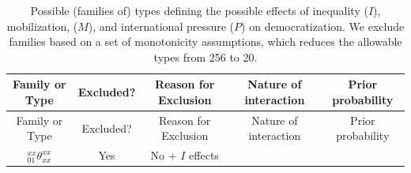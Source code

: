 \documentclass[12pt,]{book}
\begin{document}
\begin{longtable}[]{@{}ccccc@{}}
\caption{\label{tab:apptypes} Possible (families of) types defining the possible effects of inequality (\(I\)), mobilization, (\(M\)), and international pressure (\(P\)) on democratization. We exclude families based on a set of monotonicity assumptions, which reduces the allowable types from 256 to 20.}\tabularnewline
\toprule
\begin{minipage}[b]{0.24\columnwidth}\centering
Family or Type\strut
\end{minipage} & \begin{minipage}[b]{0.09\columnwidth}\centering
Excluded?\strut
\end{minipage} & \begin{minipage}[b]{0.20\columnwidth}\centering
Reason for Exclusion\strut
\end{minipage} & \begin{minipage}[b]{0.18\columnwidth}\centering
Nature of interaction\strut
\end{minipage} & \begin{minipage}[b]{0.15\columnwidth}\centering
Prior probability\strut
\end{minipage}\tabularnewline
\midrule
\endfirsthead
\toprule
\begin{minipage}[b]{0.24\columnwidth}\centering
Family or Type\strut
\end{minipage} & \begin{minipage}[b]{0.09\columnwidth}\centering
Excluded?\strut
\end{minipage} & \begin{minipage}[b]{0.20\columnwidth}\centering
Reason for Exclusion\strut
\end{minipage} & \begin{minipage}[b]{0.18\columnwidth}\centering
Nature of interaction\strut
\end{minipage} & \begin{minipage}[b]{0.15\columnwidth}\centering
Prior probability\strut
\end{minipage}\tabularnewline
\midrule
\endhead
\begin{minipage}[t]{0.24\columnwidth}\centering
\(_{01}^{xx}\theta_{xx}^{xx}\)\strut
\end{minipage} & \begin{minipage}[t]{0.09\columnwidth}\centering
Yes\strut
\end{minipage} & \begin{minipage}[t]{0.20\columnwidth}\centering
No + \(I\) effects\strut

\end{minipage}
\end{longtable}
\end{document}
